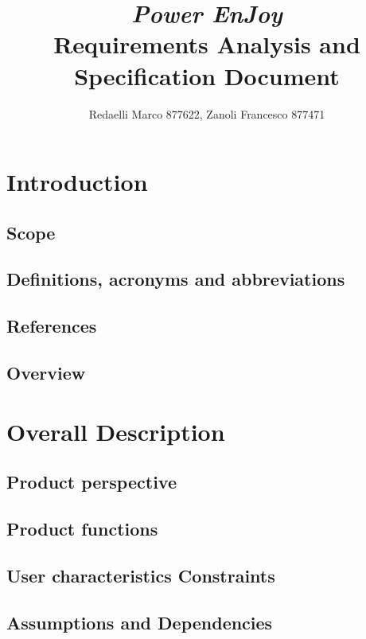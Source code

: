 \documentclass[]{report}
\title{{\Huge\textit{Power EnJoy}}\\{\LARGE Requirements Analysis and Specification Document}}
\author{Redaelli Marco 877622, Zanoli Francesco 877471}
\begin{document}
\maketitle

\tableofcontents

\chapter{Introduction}



\section{Scope}


\section{Definitions, acronyms and abbreviations}


\section{References}


\section{Overview}


\chapter{Overall Description}

\section{Product perspective}
\section{Product functions}
\section{User characteristics Constraints}
\section{Assumptions and Dependencies}
\end{document}
